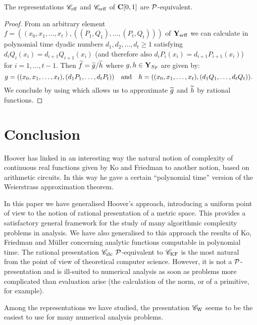 \begin{theorem} \label{532}
The representations ${{{\mathscr C}}_{\rm rff}}$ and ${{{\mathscr C}}_{\rm srff}}$ of ${{\bf C}[0,1]}$ are ${\cal P}$-equivalent.
\end{theorem}

\begin{proof}
From an arbitrary element $f=((x_0,x_1,\ldots,x_t),((P_1,Q_1),\ldots,(P_t,Q_t)))$ of ${{\bf Y}_{\rm srff}}$ we can calculate in polynomial time dyadic numbers $d_1, d_2,\ldots,d_t \geq 1$  satisfying $d_iQ_i(x_i) = d_{i+1}Q_{i+1}(x_i)$ (and therefore also $d_iP_i(x_i) = d_{i+1}P_{i+1}(x_i)$) for $i = 1, \ldots, t-1$.
Then $\widetilde{f} = \widetilde{g} / \widetilde{h}$ where $g,h \in {\bf Y}_{Sp}$ are given by:
\[
g = ((x_0,x_1,\ldots,x_t),(d_1P_1,\ldots,d_tP_t)) \quad  {\rm and} \quad  h = ((x_0,x_1,\ldots,x_t),(d_1Q_1,\ldots,d_tQ_t)).
\]
We conclude by using   which allows us to approximate $\widetilde g$ and $\widetilde h$ by rational functions. 
\end{proof}
 



\section*{Conclusion}\label{sec Conclusion}
Hoover has linked in an interesting way the natural notion of complexity of continuous real functions given by Ko and Friedman to another notion, based on arithmetic circuits. In this way he gave a certain ``polynomial time'' version of the Weierstrass approximation theorem. 

In this paper we have generalised Hoover's approach, introducing a uniform  point of view to the notion of rational presentation of a metric space.
This provides a satisfactory general framework for the study of many algorithmic complexity problems in analysis. 
We have also generalised to this approach the results of Ko, Friedman and Müller concerning analytic functions computable in polynomial time. 
The rational presentation ${{{\mathscr C}}_{\rm slc}}$ ${\cal P}$-equivalent to ${{{\mathscr C}}_{\rm KF}}$ is the most natural from the point of view of theoretical computer science. 
However, it is not a ${\cal P}$-presentation and is ill-suited to numerical analysis as soon as problems more complicated than evaluation arise (the calculation of the norm, or of a primitive, for example).

Among the representations we have studied, the presentation ${{{\mathscr C}}_{\rm W}}$ seems to be the easiest to use for many numerical analysis problems. 

